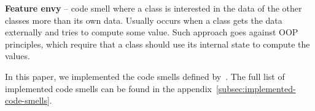 \begin{flushleft}
    \textbf{Feature envy} -- code smell where a class is interested in the data of the other classes
    more than its own data.
    Usually occurs when a class gets the data externally and tries to compute some value.
    Such approach goes against OOP principles, which require that a class should use its internal state to compute the values.
\end{flushleft}

In this paper, we implemented the code smells defined by~\citeauthor{refactoring-fowler}.
The full list of implemented code smells can be found in the appendix~\ref{subsec:implemented-code-smells}.
